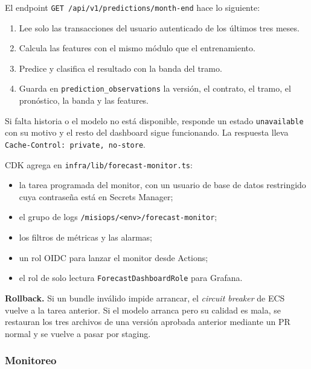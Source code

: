 El endpoint \texttt{GET /api/v1/predictions/month-end} hace lo siguiente:
\begin{enumerate}
    \item Lee solo las transacciones del usuario autenticado de los últimos tres meses.
    \item Calcula las features con el mismo módulo que el entrenamiento.
    \item Predice y clasifica el resultado con la banda del tramo.
    \item Guarda en \texttt{prediction\_observations} la versión, el contrato, el tramo, el pronóstico, la banda y las features.
\end{enumerate}
Si falta historia o el modelo no está disponible, responde un estado \texttt{unavailable} con su motivo y el resto del dashboard sigue funcionando. La respuesta lleva \texttt{Cache-Control: private, no-store}.

CDK agrega en \texttt{infra/lib/forecast-monitor.ts}:
\begin{itemize}
    \item la tarea programada del monitor, con un usuario de base de datos restringido cuya contraseña está en Secrets Manager;
    \item el grupo de logs \texttt{/misiops/<env>/forecast-monitor};
    \item los filtros de métricas y las alarmas;
    \item un rol OIDC para lanzar el monitor desde Actions;
    \item el rol de solo lectura \texttt{ForecastDashboardRole} para Grafana.
\end{itemize}

\textbf{Rollback.} Si un bundle inválido impide arrancar, el \textit{circuit breaker} de ECS vuelve a la tarea anterior. Si el modelo arranca pero su calidad es mala, se restauran los tres archivos de una versión aprobada anterior mediante un PR normal y se vuelve a pasar por staging.

\subsubsection{Monitoreo}


